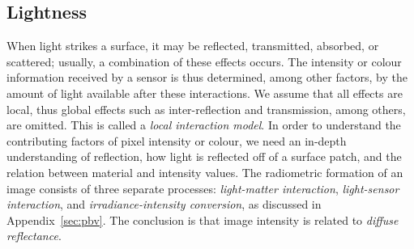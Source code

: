 


\subsection{Lightness}
When light strikes a surface, it may be reflected, transmitted, absorbed, or scattered; usually, a combination of these effects occurs. The intensity or colour information received by a sensor is thus determined, among other factors, by the amount of light available after these interactions. We assume that all effects are local, thus global effects such as inter-reflection and transmission, among others, are omitted. This is called a \textit{local interaction model}. In order to understand the contributing factors of pixel intensity or colour, we need an in-depth understanding of reflection, \ie how light is reflected off of a surface patch, and the relation between material and intensity values. The radiometric formation of an image consists of three separate processes: \textit{light-matter interaction}, \textit{light-sensor interaction}, and \textit{irradiance-intensity conversion}, as discussed in Appendix~\ref{sec:pbv}. The conclusion is that image intensity is related to \textit{diffuse reflectance}.

